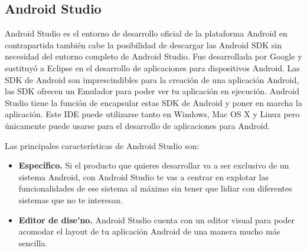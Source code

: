 
\subsection{Android Studio}
\label{cap2:subsec:androidstudio}

Android Studio es el entorno de desarrollo oficial de la plataforma Android en contrapartida tambi\'en cabe la posibilidad de descargar las Android SDK sin necesidad del entorno completo de Android Studio. Fue desarrollada por Google y sustituy\'o a Eclipse en el desarrollo de aplicaciones para dispositivos Android. Las SDK de Android son imprescindibles para la creaci\'on de una aplicaci\'on Android, las SDK ofrecen un Emulador para poder ver tu aplicaci\'on en ejecuci\'on. Android Studio tiene la funci\'on de encapsular estas SDK de Android y poner en marcha la aplicaci\'on. Este IDE puede utilizarse tanto en Windows, Mac OS X y Linux pero \'unicamente puede usarse para el desarrollo de aplicaciones para Android.


Las principales caracter\'isticas de Android Studio son:

\begin{itemize}

\item \textbf{Espec\'ifico.} Si el producto que quieres desarrollar va a ser exclusivo de un sistema Android, con Android Studio te vas a centrar en explotar las funcionalidades de ese sistema al m\'aximo sin tener que lidiar con diferentes sistemas que no te interesan.
\item \textbf{Editor de dise'no.} Android Studio cuenta con un editor visual para poder acomodar el layout de tu aplicaci\'on Android de una manera mucho m\'as sencilla.

\end{itemize}
